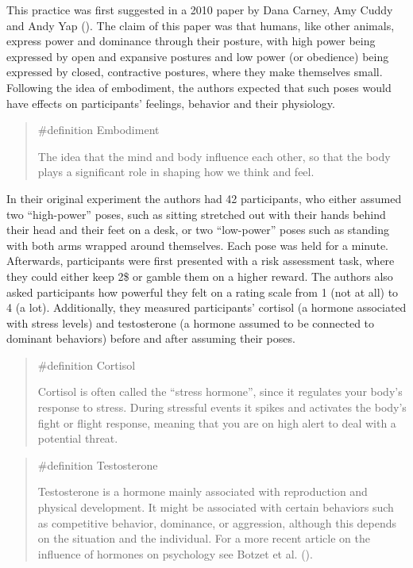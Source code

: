 \documentclass[
  letterpaper,
]{book}
\begin{document}
This practice was first suggested in a 2010 paper by Dana Carney, Amy
Cuddy and Andy Yap (). The claim of this paper was that humans, like other animals,
express power and dominance through their posture, with high power being
expressed by open and expansive postures and low power (or obedience)
being expressed by closed, contractive postures, where they make
themselves small. Following the idea of embodiment, the authors expected
that such poses would have effects on participants' feelings, behavior
and their physiology.

\begin{quote}
\label{def-embodiment}{\#definition} Embodiment

The idea that the mind and body influence each other, so that the body
plays a significant role in shaping how we think and feel.
\end{quote}

In their original experiment the authors had 42 participants, who either
assumed two ``high-power'' poses, such as sitting stretched out with
their hands behind their head and their feet on a desk, or two
``low-power'' poses such as standing with both arms wrapped around
themselves. Each pose was held for a minute. Afterwards, participants
were first presented with a risk assessment task, where they could
either keep 2\$ or gamble them on a higher reward. The authors also
asked participants how powerful they felt on a rating scale from 1 (not
at all) to 4 (a lot). Additionally, they measured participants' cortisol
(a hormone associated with stress levels) and testosterone (a hormone
assumed to be connected to dominant behaviors) before and after assuming
their poses.

\begin{quote}
\label{def-cortisol}{\#definition} Cortisol

Cortisol is often called the ``stress hormone'', since it regulates your
body's response to stress. During stressful events it spikes and
activates the body's fight or flight response, meaning that you are on
high alert to deal with a potential threat.
\end{quote}

\begin{quote}
\label{def-testosterone}{\#definition} Testosterone

Testosterone is a hormone mainly associated with reproduction and
physical development. It might be associated with certain behaviors such
as competitive behavior, dominance, or aggression, although this depends
on the situation and the individual. For a more recent article on the
influence of hormones on psychology see Botzet et al.
().
\end{quote}
\end{document}
